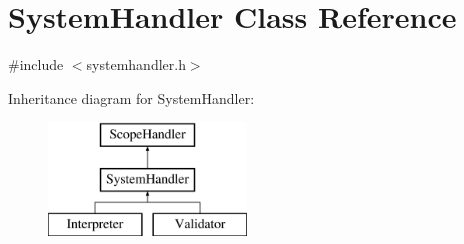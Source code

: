 \hypertarget{classSystemHandler}{}\section{System\+Handler Class Reference}
\label{classSystemHandler}


{\ttfamily \#include $<$systemhandler.\+h$>$}

Inheritance diagram for System\+Handler\+:\begin{figure}[H]
\begin{center}
\leavevmode
\includegraphics[height=3.000000cm]{classSystemHandler}
\end{center}
\end{figure}
